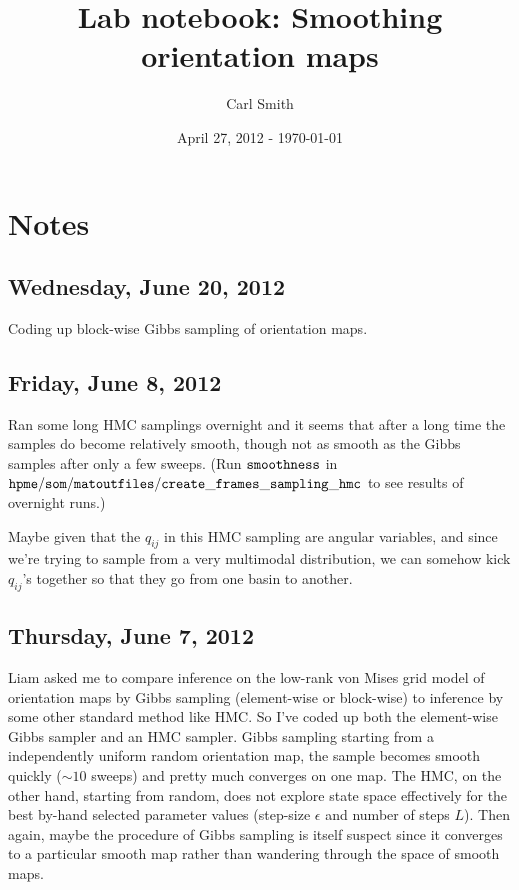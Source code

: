 \documentclass[11pt]{article}
\begin{document}
\title{Lab notebook: Smoothing orientation maps}
\author{Carl Smith}
\date{April 27, 2012 - \today}
\maketitle

\section*{Notes}

\subsection*{Wednesday, June 20, 2012}
Coding up block-wise Gibbs sampling of orientation maps.

\subsection*{Friday, June 8, 2012}
Ran some long HMC samplings overnight and it seems that after a long time the samples do become relatively smooth, though not as smooth as the Gibbs samples after only a few sweeps. (Run $\tt{smoothness}$ in $\tt{hpme/som/matoutfiles/create\_frames\_sampling\_hmc}$ to see results of overnight runs.)

Maybe given that the $q_{ij}$ in this HMC sampling are angular variables, and since we're trying to sample from a very multimodal distribution, we can somehow kick $q_{ij}$'s together so that they go from one basin to another.

\subsection*{Thursday, June 7, 2012}
Liam asked me to compare inference on the low-rank von Mises grid model of orientation maps by Gibbs sampling (element-wise or block-wise) to inference by some other standard method like HMC. So I've coded up both the element-wise Gibbs sampler and an HMC sampler. Gibbs sampling starting from a independently uniform random orientation map, the sample becomes smooth quickly ($\sim10$ sweeps) and pretty much converges on one map. The HMC, on the other hand, starting from random, does not explore state space effectively for the best by-hand selected parameter values (step-size $\epsilon$ and number of steps $L$). Then again, maybe the procedure of Gibbs sampling is itself suspect since it converges to a particular smooth map rather than wandering through the space of smooth maps.
\end{document}
